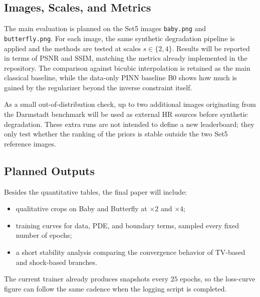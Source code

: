 \documentclass[conference]{IEEEtran}
\begin{document}
\subsection{Images, Scales, and Metrics}
The main evaluation is planned on the Set5 images \texttt{baby.png} and
\texttt{butterfly.png}. For each image, the same synthetic degradation
pipeline is applied and the methods are tested at scales
$s \in \{2,4\}$. Results will be reported in terms of PSNR and SSIM,
matching the metrics already implemented in the repository. The
comparison against bicubic interpolation is retained as the main
classical baseline, while the data-only PINN baseline B0 shows how much
is gained by the regularizer beyond the inverse constraint itself.

As a small out-of-distribution check, up to two additional images
originating from the Darmstadt benchmark will be used as external HR
sources before synthetic degradation. These extra runs are not intended
to define a new leaderboard; they only test whether the ranking of the
priors is stable outside the two Set5 reference images.

\subsection{Planned Outputs}
Besides the quantitative tables, the final paper will include:
\begin{itemize}
\item qualitative crops on Baby and Butterfly at $\times 2$ and
      $\times 4$;
\item training curves for data, PDE, and boundary terms, sampled every
      fixed number of epochs;
\item a short stability analysis comparing the convergence behavior of
      TV-based and shock-based branches.
\end{itemize}
The current trainer already produces snapshots every $25$ epochs, so
the loss-curve figure can follow the same cadence when the logging
script is completed.
\end{document}
